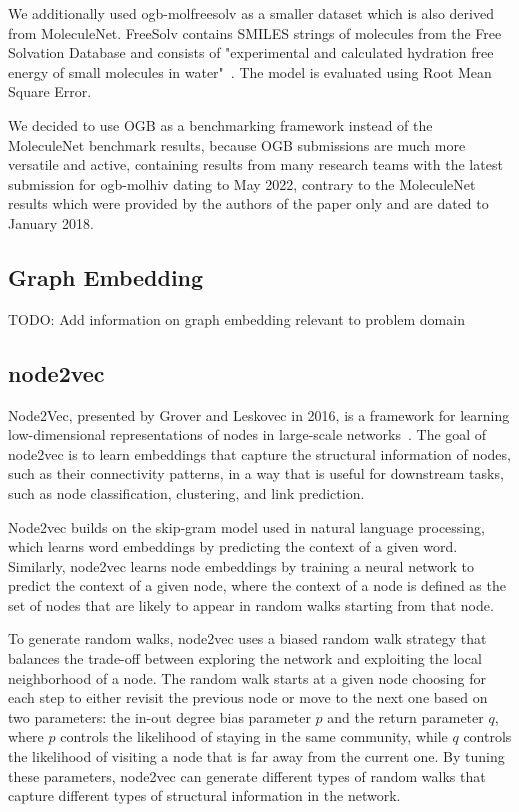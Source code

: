 We additionally used ogb-molfreesolv as a smaller dataset which is also derived from MoleculeNet. FreeSolv contains SMILES strings of molecules from the Free Solvation Database and consists of "experimental and calculated hydration free energy of small molecules in water"~\cite{2018moleculenet}. The model is evaluated using Root Mean Square Error.

We decided to use OGB as a benchmarking framework instead of the MoleculeNet benchmark results, because OGB submissions are much more versatile and active, containing results from many research teams with the latest submission for ogb-molhiv dating to May 2022, contrary to the MoleculeNet results which were provided by the authors of the paper only and are dated to January 2018.


\subsection{Graph Embedding}
TODO: Add information on graph embedding relevant to problem domain

\subsection{node2vec}

Node2Vec, presented by Grover and Leskovec in 2016, is a framework for learning low-dimensional representations of nodes in large-scale networks~\cite{2016node2vec}. The goal of node2vec is to learn embeddings that capture the structural information of nodes, such as their connectivity patterns, in a way that is useful for downstream tasks, such as node classification, clustering, and link prediction.

Node2vec builds on the skip-gram model used in natural language processing, which learns word embeddings by predicting the context of a given word. Similarly, node2vec learns node embeddings by training a neural network to predict the context of a given node, where the context of a node is defined as the set of nodes that are likely to appear in random walks starting from that node.

To generate random walks, node2vec uses a biased random walk strategy that balances the trade-off between exploring the network and exploiting the local neighborhood of a node. The random walk starts at a given node choosing for each step to either revisit the previous node or move to the next one based on two parameters: the in-out degree bias parameter $p$ and the return parameter $q$, where $p$ controls the likelihood of staying in the same community, while $q$ controls the likelihood of visiting a node that is far away from the current one. By tuning these parameters, node2vec can generate different types of random walks that capture different types of structural information in the network.

